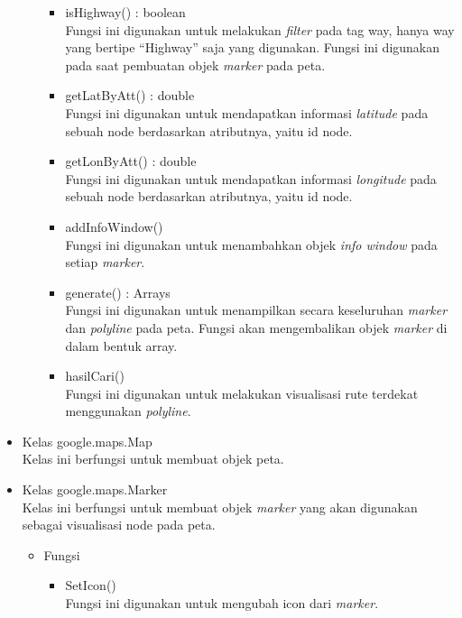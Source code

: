 \begin{itemize}
\begin{itemize}
\begin{itemize}
      \item isHighway() : boolean\\
      Fungsi ini digunakan untuk melakukan \textit{filter} pada tag way, hanya
      way yang bertipe ``Highway'' saja yang digunakan. Fungsi ini digunakan
      pada saat pembuatan objek \textit{marker} pada peta.
      
       \item getLatByAtt() : double\\
      Fungsi ini digunakan untuk mendapatkan informasi \textit{latitude} pada
      sebuah node berdasarkan atributnya, yaitu id node.
      
      \item getLonByAtt() : double\\
      Fungsi ini digunakan untuk mendapatkan informasi \textit{longitude} pada
      sebuah node berdasarkan atributnya, yaitu id node.
      
      \item addInfoWindow()\\
      Fungsi ini digunakan untuk menambahkan objek \textit{info window} pada
      setiap \textit{marker}.
      
      \item generate() : Arrays\\
      Fungsi ini digunakan untuk menampilkan secara keseluruhan \textit{marker}
      dan \textit{polyline} pada peta. Fungsi akan mengembalikan
      objek \textit{marker} di dalam bentuk array.
      
      \item hasilCari()\\
      Fungsi ini digunakan untuk melakukan visualisasi rute terdekat menggunakan
      \textit{polyline}.
    \end{itemize}
  \end{itemize}
  
  \item Kelas google.maps.Map\\
  Kelas ini berfungsi untuk membuat objek peta.
  
  \item Kelas google.maps.Marker\\
  Kelas ini berfungsi untuk membuat objek \textit{marker} yang akan digunakan
  sebagai visualisasi node pada peta.
  \begin{itemize}
    \item Fungsi
    \begin{itemize}
      \item SetIcon()\\
      Fungsi ini digunakan untuk mengubah icon dari \textit{marker}.
    \end{itemize}
  \end{itemize}
  

\end{itemize}
